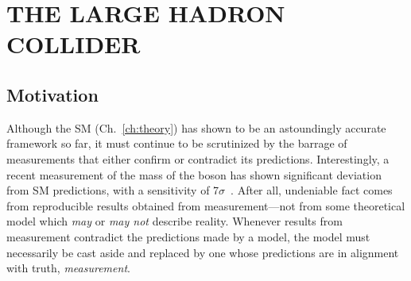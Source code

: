 
\chapter{THE LARGE HADRON COLLIDER}
\label{ch:lhc}

\section{Motivation}
Although the SM (Ch.~\ref{ch:theory}) has shown to be an astoundingly accurate framework so far, it must continue to be scrutinized by the barrage of measurements that either confirm or contradict its predictions.
Interestingly, a recent measurement of the mass of the \PW boson has shown significant deviation from SM predictions, with a sensitivity of 7$\sigma$~\cite{cdf_collaboration_high-precision_2022}.
After all, undeniable fact comes from reproducible results obtained from measurement---not from some theoretical model which \emph{may} or \emph{may not} describe reality.
Whenever results from measurement contradict the predictions made by a model, the model must necessarily be cast aside and replaced by one whose predictions are in alignment with truth, \ie \emph{measurement}.

